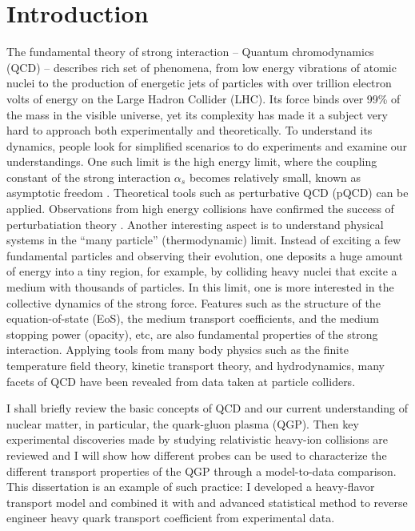 \chapter{Introduction}
\label{chapter:introduction}
The fundamental theory of strong interaction -- Quantum chromodynamics (QCD) -- describes rich set of phenomena, from low energy vibrations of atomic nuclei to the production of energetic jets of particles with over trillion electron volts of energy on the Large Hadron Collider (LHC).
Its force binds over 99\% of the mass in the visible universe, yet its complexity has made it a subject very hard to approach both experimentally and theoretically.
To understand its dynamics, people look for simplified scenarios to do experiments and examine our understandings.
One such limit is the high energy limit, where the coupling constant of the strong interaction $\alpha_s$ becomes relatively small, known as asymptotic freedom \cite{Gross:1973id,Politzer:1973fx}. 
Theoretical tools such as perturbative QCD (pQCD) can be applied.
Observations from high energy collisions have confirmed the success of perturbatiation theory \cite{RevModPhys.59.465}.
Another interesting aspect is to understand physical systems in the ``many particle'' (thermodynamic) limit.
Instead of exciting a few fundamental particles and observing their evolution, one deposits a huge amount of energy into a tiny region, for example, by colliding heavy nuclei that excite a medium with thousands of particles. 
In this limit, one is more interested in the collective dynamics of the strong force.
Features such as the structure of the equation-of-state (EoS), the medium transport coefficients, and the medium stopping power (opacity), etc, are also fundamental properties of the strong interaction.
Applying tools from many body physics such as the finite temperature field theory, kinetic transport theory, and hydrodynamics, many facets of QCD have been revealed from data taken at particle colliders.

I shall briefly review the basic concepts of QCD and our current understanding of nuclear matter, in particular, the quark-gluon plasma (QGP). 
Then key experimental discoveries made by studying relativistic heavy-ion collisions are reviewed and I will show how different probes can be used to characterize the different transport properties of the QGP through a model-to-data comparison.
This dissertation is an example of such practice: I developed a heavy-flavor transport model and combined it with and advanced statistical method to reverse engineer heavy quark transport coefficient from experimental data.


